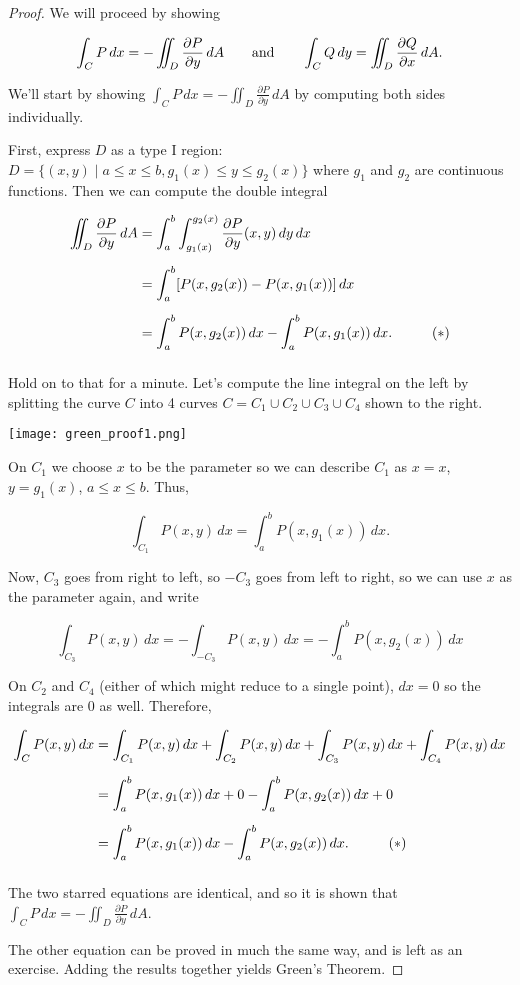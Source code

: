 \documentclass[11pt,oneside,english]{amsart}
\theoremstyle{definition}
\newcommand{\aspace}{\hspace{7mm}\text{and}\hspace{7mm}}
\newcommand{\pp}[2]{\frac{\partial{#1}}{\partial{#2}}}
\begin{document}
\begin{proof}
We will proceed by showing 

\[
\int_CP\,dx=-\iint_D\pp{P}{y}\,dA\aspace \int_CQ\,dy=\iint_D\pp{Q}{x}\,dA.
\]

We'll start by showing $\displaystyle \int_CP\,dx=-\iint_D\pp{P}{y}\,dA$ by computing both sides individually. 

First, express $D$ as a type I region: $D=\{(x,y)\mid a\leq x\leq b,g_1(x)\leq y\leq g_2(x)\}$ where $g_1$ and $g_2$ are continuous functions. Then we can compute the double integral

\begin{align*}
\iint_D\pp{P}{y}\,dA&=\int_a^b\int_{g_1(x)}^{g_2(x)}\pp{P}{y}(x,y)\,dy\,dx\\[2mm]
&=\int_a^b[P(x,g_2(x))-P(x,g_1(x))]\,dx\\[2mm]
&=\int_a^bP(x,g_2(x))\,dx-\int_a^bP(x,g_1(x))\,dx.\hspace{10mm}(*)\\[2mm]
\end{align*}

\begin{multicols}{2}
Hold on to that for a minute. Let's compute the line integral on the left by splitting the curve $C$ into 4 curves $C=C_1\cup C_2\cup C_3 \cup C_4$ shown to the right.


\begin{center}
\texttt{[image: green\_proof1.png]}
\end{center}
\end{multicols}
On $C_1$ we choose $x$ to be the parameter so we can describe $C_1$ as $x=x$, $y=g_1(x)$, $a\leq x\leq b$. Thus,

\[
\int_{C_1}P(x,y)\,dx=\int_a^bP(x,g_1(x))\,dx.
\]

Now, $C_3$ goes from right to left, so $-C_3$ goes from left to right, so we can use $x$ as the parameter again, and write 

\[
\int_{C_3}P(x,y)\,dx=-\int_{-C_3}P(x,y)\,dx=-\int_a^bP(x,g_2(x))\,dx
\]

On $C_2$ and $C_4$ (either of which might reduce to a single point), $dx=0$ so the integrals are 0 as well. Therefore,

\begin{align*}
\int_CP(x,y)\,dx&=\int_{C_1}P(x,y)\,dx+\int_{C_2}P(x,y)\,dx+\int_{C_3}P(x,y)\,dx+\int_{C_4}P(x,y)\,dx\\[2mm]
&=\int_a^bP(x,g_1(x))\,dx+0 -\int_a^bP(x,g_2(x))\,dx+0\\[2mm]
&=\int_a^bP(x,g_1(x))\,dx -\int_a^bP(x,g_2(x))\,dx.\hspace{10mm}(*)\\[2mm]
\end{align*}

The two starred equations are identical, and so it is shown that $\displaystyle \int_CP\,dx=-\iint_D\pp{P}{y}\,dA$.

The other equation can be proved in much the same way, and is left as an exercise. Adding the results together yields Green's Theorem.
\end{proof}
\end{document}
